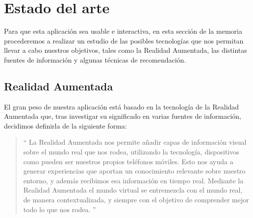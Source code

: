 
\cleardoublepage


\chapter{Estado del arte}
\label{makereference2}
Para que esta aplicación sea usable e interactiva, en esta sección de la memoria procederemos a 
realizar un estudio de las posibles tecnologías que nos permitan llevar a cabo nuestros objetivos, 
tales como la Realidad Aumentada, las distintas fuentes de información y algunas
técnicas de recomendación. 
\section{Realidad Aumentada}
\label{makereference2.1}
El gran peso de nuestra aplicación está basado en la tecnología de la Realidad Aumentada que, tras investigar su significado en varias fuentes de información,
decidimos definirla de la siguiente forma:
\begin{quote}
``
La Realidad Aumentada nos permite añadir capas de información visual sobre el 
mundo real que nos rodea, utilizando la tecnología, dispositivos como pueden ser 
nuestros propios teléfonos móviles. Esto nos ayuda a generar experiencias que aportan
un conocimiento relevante sobre nuestro entorno, y además recibimos esa información en 
tiempo real. Mediante la Realidad Aumentada el mundo virtual se entremezcla con el mundo 
real, de manera contextualizada, y siempre con el objetivo de comprender mejor todo lo que 
nos rodea.\cite{neosentec}
''
\end{quote}



